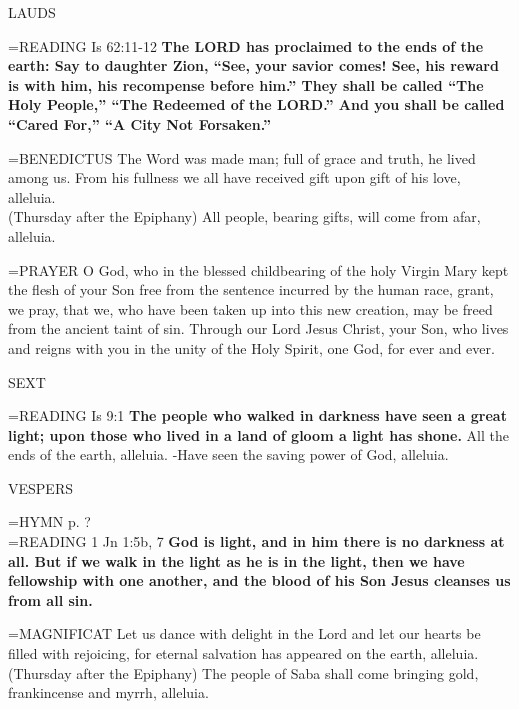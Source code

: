 \begin{flushleft}\normalsize LAUDS\\\end{flushleft}
\hangindent=\parindent \small{READING}    Is 62:11-12 \textbf{   The LORD has proclaimed to the ends of the earth: Say to daughter Zion, “See, your savior comes! See, his reward is with him, his recompense before him.” They shall be called “The Holy People,” “The Redeemed of the LORD.” And you shall be called “Cared For,” “A City Not Forsaken.”\\}

\hangindent=\parindent \small{BENEDICTUS 	The Word was made man; full of grace and truth, he lived among us. From his fullness we all have received gift upon gift of his love, alleluia.\\}
(Thursday after the Epiphany)
All people, bearing gifts, will come from afar, alleluia.

\hangindent=\parindent \small{PRAYER 	O God, who in the blessed childbearing of the holy Virgin Mary kept the flesh of your Son free from the sentence incurred by the human race, grant, we pray, that we, who have been taken up into this new creation, may be freed from the ancient taint of sin. Through our Lord Jesus Christ, your Son, who lives and reigns with you in the unity of the Holy Spirit, one God, for ever and ever.}

\begin{flushleft}\normalsize SEXT\\\end{flushleft}
\hangindent=\parindent \small{READING}    Is 9:1 \textbf{   The people who walked in darkness have seen a great light; upon those who lived in a land of gloom a light has shone.}
All the ends of the earth, alleluia.
-Have seen the saving power of God, alleluia.

\begin{flushleft}\normalsize VESPERS\\\end{flushleft}
\hangindent=\parindent \small{\uppercase{HYMN} p.  ?\\}
\hangindent=\parindent \small{READING}    1 Jn 1:5b, 7 \textbf{   God is light, and in him there is no darkness at all. But if we walk in the light as he is in the light, then we have fellowship with one another, and the blood of his Son Jesus cleanses us from all sin.\\}

\hangindent=\parindent \small{MAGNIFICAT 	Let us dance with delight in the Lord and let our hearts be filled with rejoicing, for eternal salvation has appeared on the earth, alleluia.\\}
(Thursday after the Epiphany)
The people of Saba shall come bringing gold, frankincense and myrrh, alleluia.

